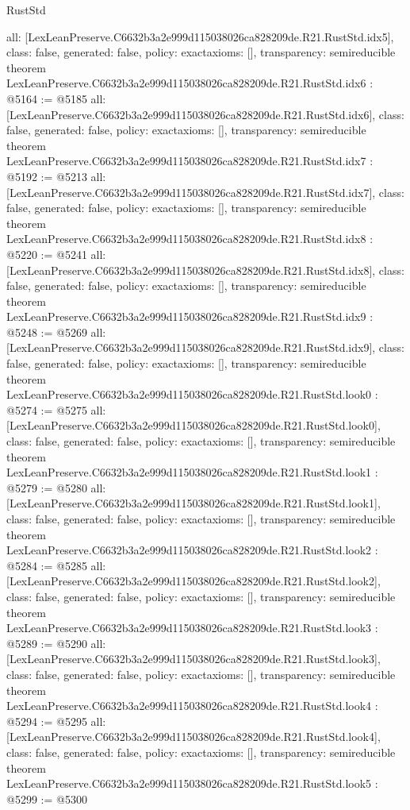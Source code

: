 \begin{lexlean}{RustStd}
\begin{coremodule}
{  all: [LexLeanPreserve.C6632b3a2e999d115038026ca828209de.R21.RustStd.idx5],
  class: false,
  generated: false,
  policy: exact{axioms: []},
  transparency: semireducible
}
theorem LexLeanPreserve.C6632b3a2e999d115038026ca828209de.R21.RustStd.idx6 : @5164 := @5185 {
  all: [LexLeanPreserve.C6632b3a2e999d115038026ca828209de.R21.RustStd.idx6],
  class: false,
  generated: false,
  policy: exact{axioms: []},
  transparency: semireducible
}
theorem LexLeanPreserve.C6632b3a2e999d115038026ca828209de.R21.RustStd.idx7 : @5192 := @5213 {
  all: [LexLeanPreserve.C6632b3a2e999d115038026ca828209de.R21.RustStd.idx7],
  class: false,
  generated: false,
  policy: exact{axioms: []},
  transparency: semireducible
}
theorem LexLeanPreserve.C6632b3a2e999d115038026ca828209de.R21.RustStd.idx8 : @5220 := @5241 {
  all: [LexLeanPreserve.C6632b3a2e999d115038026ca828209de.R21.RustStd.idx8],
  class: false,
  generated: false,
  policy: exact{axioms: []},
  transparency: semireducible
}
theorem LexLeanPreserve.C6632b3a2e999d115038026ca828209de.R21.RustStd.idx9 : @5248 := @5269 {
  all: [LexLeanPreserve.C6632b3a2e999d115038026ca828209de.R21.RustStd.idx9],
  class: false,
  generated: false,
  policy: exact{axioms: []},
  transparency: semireducible
}
theorem LexLeanPreserve.C6632b3a2e999d115038026ca828209de.R21.RustStd.look0 : @5274 := @5275 {
  all: [LexLeanPreserve.C6632b3a2e999d115038026ca828209de.R21.RustStd.look0],
  class: false,
  generated: false,
  policy: exact{axioms: []},
  transparency: semireducible
}
theorem LexLeanPreserve.C6632b3a2e999d115038026ca828209de.R21.RustStd.look1 : @5279 := @5280 {
  all: [LexLeanPreserve.C6632b3a2e999d115038026ca828209de.R21.RustStd.look1],
  class: false,
  generated: false,
  policy: exact{axioms: []},
  transparency: semireducible
}
theorem LexLeanPreserve.C6632b3a2e999d115038026ca828209de.R21.RustStd.look2 : @5284 := @5285 {
  all: [LexLeanPreserve.C6632b3a2e999d115038026ca828209de.R21.RustStd.look2],
  class: false,
  generated: false,
  policy: exact{axioms: []},
  transparency: semireducible
}
theorem LexLeanPreserve.C6632b3a2e999d115038026ca828209de.R21.RustStd.look3 : @5289 := @5290 {
  all: [LexLeanPreserve.C6632b3a2e999d115038026ca828209de.R21.RustStd.look3],
  class: false,
  generated: false,
  policy: exact{axioms: []},
  transparency: semireducible
}
theorem LexLeanPreserve.C6632b3a2e999d115038026ca828209de.R21.RustStd.look4 : @5294 := @5295 {
  all: [LexLeanPreserve.C6632b3a2e999d115038026ca828209de.R21.RustStd.look4],
  class: false,
  generated: false,
  policy: exact{axioms: []},
  transparency: semireducible
}
theorem LexLeanPreserve.C6632b3a2e999d115038026ca828209de.R21.RustStd.look5 : @5299 := @5300 {
}
\end{coremodule}
\end{lexlean}
